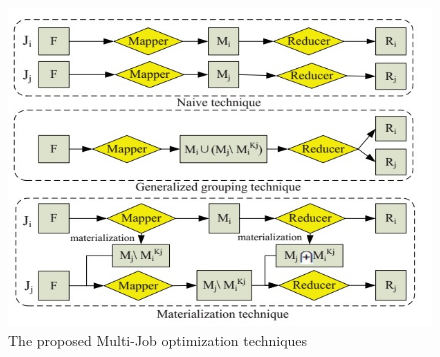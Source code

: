 \documentclass[conference]{sig-alternate-05-2015}
\begin{document}
\begin{figure}[htbp]
	\centering	 
		\includegraphics[width=0.95\columnwidth]{images/2.jpeg}
	\caption{The proposed Multi-Job optimization techniques}
	\label{fig:multijob}
\end{figure}



\end{document}

